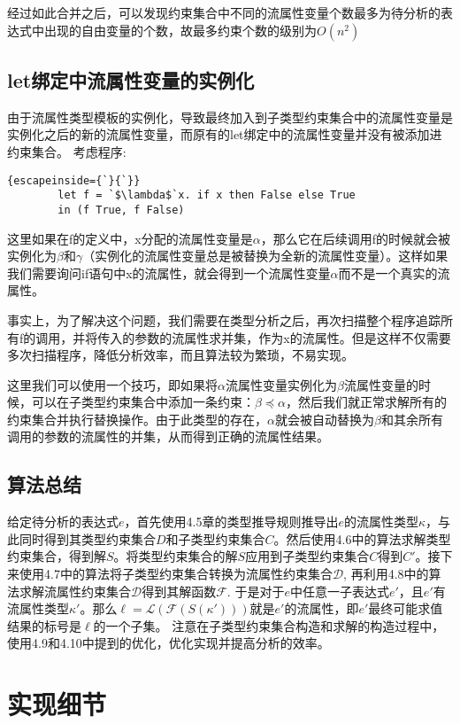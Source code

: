 \documentclass[UTF8, colorlinks]{pkuthss}
\begin{document}
	经过如此合并之后，可以发现约束集合中不同的流属性变量个数最多为待分析的表达式中出现的自由变量的个数，故最多约束个数的级别为$O(n^2)$
	
	\section{let绑定中流属性变量的实例化}
	由于流属性类型模板的实例化，导致最终加入到子类型约束集合中的流属性变量是实例化之后的新的流属性变量，而原有的let绑定中的流属性变量并没有被添加进约束集合。
	考虑程序:
	\begin{lstlisting}{escapeinside={`}{`}}
		let f = `$\lambda$`x. if x then False else True
		in (f True, f False)
	\end{lstlisting}
	这里如果在f的定义中，x分配的流属性变量是$\alpha$，那么它在后续调用f的时候就会被实例化为$\beta$和$\gamma$（实例化的流属性变量总是被替换为全新的流属性变量）。这样如果我们需要询问if语句中x的流属性，就会得到一个流属性变量$\alpha$而不是一个真实的流属性。
	
	事实上，为了解决这个问题，我们需要在类型分析之后，再次扫描整个程序追踪所有f的调用，并将传入的参数的流属性求并集，作为x的流属性。但是这样不仅需要多次扫描程序，降低分析效率，而且算法较为繁琐，不易实现。
	
	这里我们可以使用一个技巧，即如果将$\alpha$流属性变量实例化为$\beta$流属性变量的时候，可以在子类型约束集合中添加一条约束：$\beta\preceq\alpha$，然后我们就正常求解所有的约束集合并执行替换操作。由于此类型的存在，$\alpha$就会被自动替换为$\beta$和其余所有调用的参数的流属性的并集，从而得到正确的流属性结果。
	
	\section{算法总结}
	给定待分析的表达式$e$，首先使用4.5章的类型推导规则推导出$e$的流属性类型$\kappa$，与此同时得到其类型约束集合$D$和子类型约束集合$C$。然后使用4.6中的算法求解类型约束集合，得到解$S$。将类型约束集合的解$S$应用到子类型约束集合$C$得到$C'$。接下来使用4.7中的算法将子类型约束集合转换为流属性约束集合$\mathcal{D}$, 再利用4.8中的算法求解流属性约束集合$\mathcal{D}$得到其解函数$\mathcal{F}$. 于是对于$e$中任意一子表达式$e'$，且$e'$有流属性类型$\kappa'$。那么$\ell = \mathcal{L}(\mathcal{F}(S(\kappa')))$就是$e'$的流属性，即$e'$最终可能求值结果的标号是$\ell$的一个子集。 注意在子类型约束集合构造和求解的构造过程中，使用4.9和4.10中提到的优化，优化实现并提高分析的效率。
	
	\chapter{实现细节}
\end{document}
